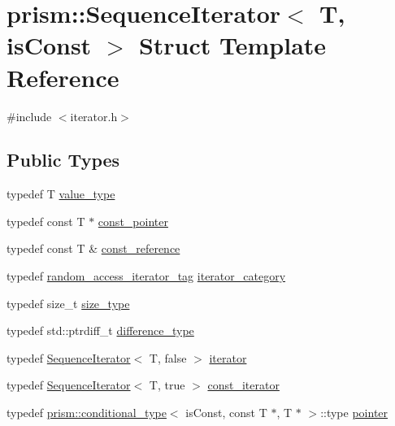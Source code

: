 \hypertarget{structprism_1_1_sequence_iterator}{}\section{prism\+:\+:Sequence\+Iterator$<$ T, is\+Const $>$ Struct Template Reference}
\label{structprism_1_1_sequence_iterator}


{\ttfamily \#include $<$iterator.\+h$>$}

\subsection*{Public Types}
\begin{DoxyCompactItemize}
\item 
typedef T \hyperlink{structprism_1_1_sequence_iterator_a3b926a44e4184aecd9ab649cadab392d}{value\+\_\+type}
\item 
typedef const T $\ast$ \hyperlink{structprism_1_1_sequence_iterator_a4c3367cd1e3aacc1cd902bab256ee6b2}{const\+\_\+pointer}
\item 
typedef const T \& \hyperlink{structprism_1_1_sequence_iterator_a7739d968cd075878171e063d7a60d2e2}{const\+\_\+reference}
\item 
typedef \hyperlink{structprism_1_1random__access__iterator__tag}{random\+\_\+access\+\_\+iterator\+\_\+tag} \hyperlink{structprism_1_1_sequence_iterator_a8525d9ddbb07664ddab39df5d6d72b03}{iterator\+\_\+category}
\item 
typedef size\+\_\+t \hyperlink{structprism_1_1_sequence_iterator_a5a9c57ebdda1cd8eb2e4b3ddbd627fcf}{size\+\_\+type}
\item 
typedef std\+::ptrdiff\+\_\+t \hyperlink{structprism_1_1_sequence_iterator_a256c83c7b6da801b16778f39697e8db3}{difference\+\_\+type}
\item 
typedef \hyperlink{structprism_1_1_sequence_iterator}{Sequence\+Iterator}$<$ T, false $>$ \hyperlink{structprism_1_1_sequence_iterator_ac791d493ea5fafcc435a83dbe2385a1e}{iterator}
\item 
typedef \hyperlink{structprism_1_1_sequence_iterator}{Sequence\+Iterator}$<$ T, true $>$ \hyperlink{structprism_1_1_sequence_iterator_a8be80243dfbbc36132e108a7858eafd0}{const\+\_\+iterator}
\item 
typedef \hyperlink{structprism_1_1conditional__type}{prism\+::conditional\+\_\+type}$<$ is\+Const, const T $\ast$, T $\ast$ $>$\+::type \hyperlink{structprism_1_1_sequence_iterator_aba1344ee0e1c4be6658f8a3413c66df2}{pointer}

\end{DoxyCompactItemize}

